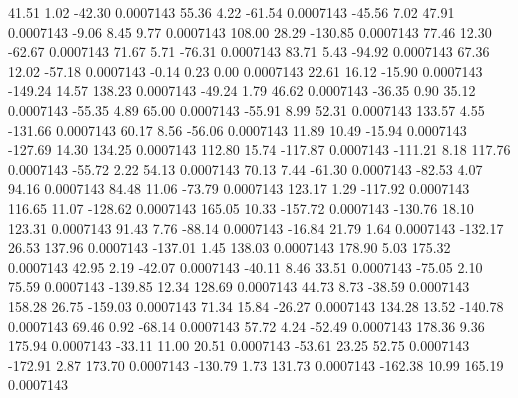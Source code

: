        41.51        1.02      -42.30     0.0007143
       55.36        4.22      -61.54     0.0007143
      -45.56        7.02       47.91     0.0007143
       -9.06        8.45        9.77     0.0007143
      108.00       28.29     -130.85     0.0007143
       77.46       12.30      -62.67     0.0007143
       71.67        5.71      -76.31     0.0007143
       83.71        5.43      -94.92     0.0007143
       67.36       12.02      -57.18     0.0007143
       -0.14        0.23        0.00     0.0007143
       22.61       16.12      -15.90     0.0007143
     -149.24       14.57      138.23     0.0007143
      -49.24        1.79       46.62     0.0007143
      -36.35        0.90       35.12     0.0007143
      -55.35        4.89       65.00     0.0007143
      -55.91        8.99       52.31     0.0007143
      133.57        4.55     -131.66     0.0007143
       60.17        8.56      -56.06     0.0007143
       11.89       10.49      -15.94     0.0007143
     -127.69       14.30      134.25     0.0007143
      112.80       15.74     -117.87     0.0007143
     -111.21        8.18      117.76     0.0007143
      -55.72        2.22       54.13     0.0007143
       70.13        7.44      -61.30     0.0007143
      -82.53        4.07       94.16     0.0007143
       84.48       11.06      -73.79     0.0007143
      123.17        1.29     -117.92     0.0007143
      116.65       11.07     -128.62     0.0007143
      165.05       10.33     -157.72     0.0007143
     -130.76       18.10      123.31     0.0007143
       91.43        7.76      -88.14     0.0007143
      -16.84       21.79        1.64     0.0007143
     -132.17       26.53      137.96     0.0007143
     -137.01        1.45      138.03     0.0007143
      178.90        5.03      175.32     0.0007143
       42.95        2.19      -42.07     0.0007143
      -40.11        8.46       33.51     0.0007143
      -75.05        2.10       75.59     0.0007143
     -139.85       12.34      128.69     0.0007143
       44.73        8.73      -38.59     0.0007143
      158.28       26.75     -159.03     0.0007143
       71.34       15.84      -26.27     0.0007143
      134.28       13.52     -140.78     0.0007143
       69.46        0.92      -68.14     0.0007143
       57.72        4.24      -52.49     0.0007143
      178.36        9.36      175.94     0.0007143
      -33.11       11.00       20.51     0.0007143
      -53.61       23.25       52.75     0.0007143
     -172.91        2.87      173.70     0.0007143
     -130.79        1.73      131.73     0.0007143
     -162.38       10.99      165.19     0.0007143
